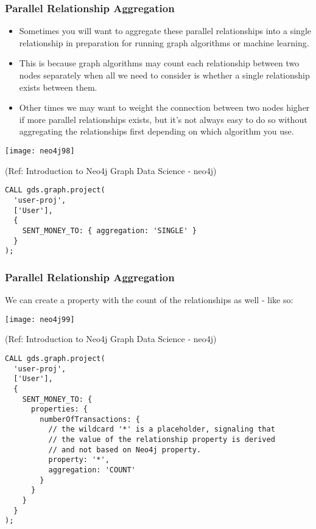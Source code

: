 \begin{frame}[fragile]\frametitle{Parallel Relationship Aggregation}

\begin{itemize}
\item Sometimes you will want to aggregate these parallel relationships into a single relationship in preparation for running graph algorithms or machine learning. 
\item This is because graph algorithms may count each relationship between two nodes separately when all we need to consider is whether a single relationship exists between them. 
\item Other times we may want to weight the connection between two nodes higher if more parallel relationships exists, but it’s not always easy to do so without aggregating the relationships first depending on which algorithm you use.
\end{itemize}

\begin{center}
\texttt{[image: neo4j98]}
\end{center}	

{\tiny (Ref: Introduction to Neo4j Graph Data Science - neo4j)}

\begin{lstlisting}
CALL gds.graph.project(
  'user-proj',
  ['User'],
  {
    SENT_MONEY_TO: { aggregation: 'SINGLE' }
  }
);
\end{lstlisting}
\end{frame}

\begin{frame}[fragile]\frametitle{Parallel Relationship Aggregation}

We can create a property with the count of the relationships as well - like so:

\begin{center}
\texttt{[image: neo4j99]}
\end{center}	

{\tiny (Ref: Introduction to Neo4j Graph Data Science - neo4j)}

\begin{lstlisting}
CALL gds.graph.project(
  'user-proj',
  ['User'],
  {
    SENT_MONEY_TO: {
      properties: {
        numberOfTransactions: {
          // the wildcard '*' is a placeholder, signaling that
          // the value of the relationship property is derived
          // and not based on Neo4j property.
          property: '*',
          aggregation: 'COUNT'
        }
      }
    }
  }
);
\end{lstlisting}
\end{frame}

